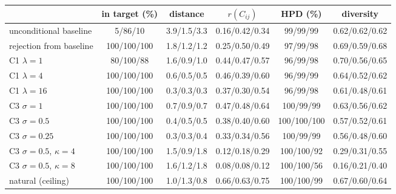 \begin{tabular}{lccccc}
\toprule
 & in target (\%) & distance & $r(C_{ij})$ & HPD (\%) & diversity \\
\midrule
unconditional baseline & 5/86/10 & 3.9/1.5/3.3 & 0.16/0.42/0.34 & 99/99/99 & 0.62/0.62/0.62 \\
rejection from baseline & 100/100/100 & 1.8/1.2/1.2 & 0.25/0.50/0.49 & 97/99/98 & 0.69/0.59/0.68 \\
\midrule
C1 $\lambda{=}1$ & 80/100/88 & 1.6/0.9/1.0 & 0.44/0.47/0.57 & 96/99/98 & 0.70/0.56/0.65 \\
C1 $\lambda{=}4$ & 100/100/100 & 0.6/0.5/0.5 & 0.46/0.39/0.60 & 96/99/99 & 0.64/0.52/0.62 \\
C1 $\lambda{=}16$ & 100/100/100 & 0.3/0.3/0.3 & 0.37/0.30/0.54 & 96/99/98 & 0.61/0.48/0.61 \\
\midrule
C3 $\sigma{=}1$ & 100/100/100 & 0.7/0.9/0.7 & 0.47/0.48/0.64 & 100/99/99 & 0.63/0.56/0.62 \\
C3 $\sigma{=}0.5$ & 100/100/100 & 0.4/0.5/0.5 & 0.38/0.40/0.60 & 100/100/100 & 0.57/0.52/0.61 \\
C3 $\sigma{=}0.25$ & 100/100/100 & 0.3/0.3/0.4 & 0.33/0.34/0.56 & 100/99/99 & 0.56/0.48/0.60 \\
\midrule
C3 $\sigma{=}0.5$, $\kappa{=}4$ & 100/100/100 & 1.5/0.9/1.8 & 0.12/0.18/0.29 & 100/100/92 & 0.29/0.31/0.55 \\
C3 $\sigma{=}0.5$, $\kappa{=}8$ & 100/100/100 & 1.6/1.2/1.8 & 0.08/0.08/0.12 & 100/100/56 & 0.16/0.21/0.40 \\
\midrule
natural (ceiling) & 100/100/100 & 1.0/1.3/0.8 & 0.66/0.63/0.75 & 100/100/99 & 0.67/0.60/0.64 \\
\bottomrule
\end{tabular}
